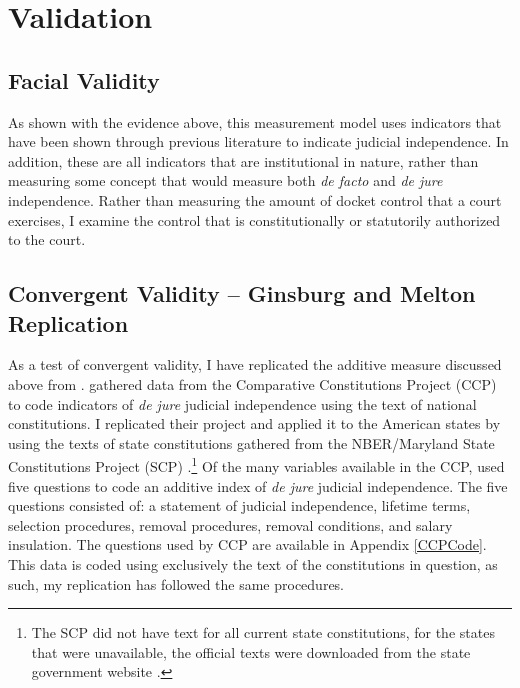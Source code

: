 \documentclass[12pt]{article}
\begin{document}
\section{Validation}\label{Validation}
\subsection{Facial Validity}
As shown with the evidence above, this measurement model uses indicators that have been shown through previous literature to indicate judicial independence. In addition, these are all indicators that are institutional in nature, rather than measuring some concept that would measure both \textit{de facto} and \textit{de jure} independence. Rather than measuring the amount of docket control that a court exercises, I examine the control that is constitutionally or statutorily authorized to the court.

\subsection{Convergent Validity -- Ginsburg and Melton Replication}
As a test of convergent validity, I have replicated the additive measure discussed above from \citet{Melton2014}.  \citet{Melton2014} gathered data from the Comparative Constitutions Project (CCP) to code indicators of \textit{de jure} judicial independence using the text of national constitutions.  I replicated their project and applied it to the American states by using the texts of state constitutions gathered from the NBER/Maryland State Constitutions Project (SCP) \citep{Wallisnber}.\footnote{The SCP did not have text for all current state constitutions, for the states that were unavailable, the official texts were downloaded from the state government website \citep{Wallisnber}.}  Of the many variables available in the CCP, \citet{Melton2014} used five questions to code an additive index of \textit{de jure} judicial independence.  The five questions consisted of: a statement of judicial independence, lifetime terms, selection procedures, removal procedures, removal conditions, and salary insulation.  The questions used by CCP are available in Appendix \ref{CCPCode}.  This data is coded using exclusively the text of the constitutions in question, as such, my replication has followed the same procedures.
\end{document}
